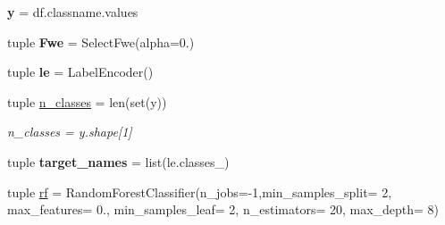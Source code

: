 \begin{DoxyCompactItemize}
\item 
\hypertarget{namespacefeat__extract_1_1_sci_kit__plot__roc_a309465c0360129f8054a078dc27ff34b}{}{\bfseries y} = df.\+classname.\+values\label{namespacefeat__extract_1_1_sci_kit__plot__roc_a309465c0360129f8054a078dc27ff34b}

\item 
\hypertarget{namespacefeat__extract_1_1_sci_kit__plot__roc_abcf1efec812b83ae64177fdd0f5a0786}{}tuple {\bfseries Fwe} = Select\+Fwe(alpha=0.)\label{namespacefeat__extract_1_1_sci_kit__plot__roc_abcf1efec812b83ae64177fdd0f5a0786}

\item 
\hypertarget{namespacefeat__extract_1_1_sci_kit__plot__roc_a73359a768a8601816742c5621f7e300d}{}tuple {\bfseries le} = Label\+Encoder()\label{namespacefeat__extract_1_1_sci_kit__plot__roc_a73359a768a8601816742c5621f7e300d}

\item 
\hypertarget{namespacefeat__extract_1_1_sci_kit__plot__roc_a579c7137b898094fed7449bcb8580d30}{}tuple \hyperlink{namespacefeat__extract_1_1_sci_kit__plot__roc_a579c7137b898094fed7449bcb8580d30}{n\+\_\+classes} = len(set(y))\label{namespacefeat__extract_1_1_sci_kit__plot__roc_a579c7137b898094fed7449bcb8580d30}

\begin{DoxyCompactList}\small\item\em n\+\_\+classes = y.\+shape\mbox{[}1\mbox{]} \end{DoxyCompactList}\item 
\hypertarget{namespacefeat__extract_1_1_sci_kit__plot__roc_a02a0d487af5ca63fa4a8e337a9fc1b5f}{}tuple {\bfseries target\+\_\+names} = list(le.\+classes\+\_\+)\label{namespacefeat__extract_1_1_sci_kit__plot__roc_a02a0d487af5ca63fa4a8e337a9fc1b5f}

\item 
\hypertarget{namespacefeat__extract_1_1_sci_kit__plot__roc_a8b0b42ffc18823f8984e05932472af40}{}tuple \hyperlink{namespacefeat__extract_1_1_sci_kit__plot__roc_a8b0b42ffc18823f8984e05932472af40}{rf} = Random\+Forest\+Classifier(n\+\_\+jobs=-\/1,min\+\_\+samples\+\_\+split= 2, max\+\_\+features= 0., min\+\_\+samples\+\_\+leaf= 2, n\+\_\+estimators= 20, max\+\_\+depth= 8)\label{namespacefeat__extract_1_1_sci_kit__plot__roc_a8b0b42ffc18823f8984e05932472af40}


\end{DoxyCompactItemize}
